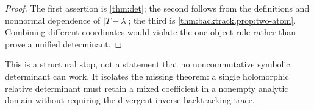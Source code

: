 \begin{proof}
The first assertion is \cref{thm:det}; the second follows from the definitions
and nonnormal dependence of $|T-\lambda|$; the third is
\cref{thm:backtrack,prop:two-atom}.  Combining different coordinates would
violate the one-object rule rather than prove a unified determinant.
\end{proof}

This is a structural stop, not a statement that no noncommutative symbolic
determinant can work.  It isolates the missing theorem: a single holomorphic
relative determinant must retain a mixed coefficient in a nonempty analytic
domain without requiring the divergent inverse-backtracking trace.
